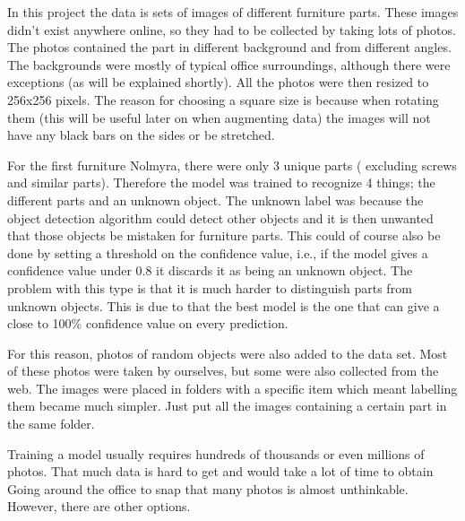 In this project the data is sets of images of different furniture parts. These images didn't exist anywhere online, so they had to be collected by taking lots of photos. The photos contained the part in different background and from different angles. The backgrounds were mostly of typical office surroundings, although there were exceptions (as will be explained shortly). All the photos were then resized to 256x256 pixels. The reason for choosing a square size is because when rotating them (this will be useful later on when augmenting data) the images will not have any black bars on the sides or be stretched.

For the first furniture Nolmyra, there were only 3 unique parts ( excluding screws and similar parts). Therefore the model was trained to recognize 4 things; the different parts and an unknown object. The unknown label was because the object detection algorithm could detect other objects and it is then unwanted that those objects be mistaken for furniture parts. This could of course also be done by setting a threshold on the confidence value, i.e., if the model gives a confidence value under 0.8 it discards it as being an unknown object. The problem with this type is that it is much harder to distinguish parts from unknown objects. This is due to that the best model is the one that can give a close to 100\% confidence value on every prediction.

For this reason, photos of random objects were also added to the data set. Most of these photos were taken by ourselves, but some were also collected from the web. The images were placed in folders with a specific item which meant labelling them became much simpler. Just put all the images containing a certain part in the same folder.

Training a model usually requires hundreds of thousands or even millions of photos. That much data is hard to get and would take a lot of time to obtain Going around the office to snap that many photos is almost unthinkable.
However, there are other options.

